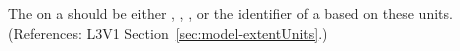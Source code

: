 The  on a \Model should be either ,
 , ,
 or the identifier of a \UnitDefinition based
on these units.  (References: L3V1 Section~\ref{sec:model-extentUnits}.)
